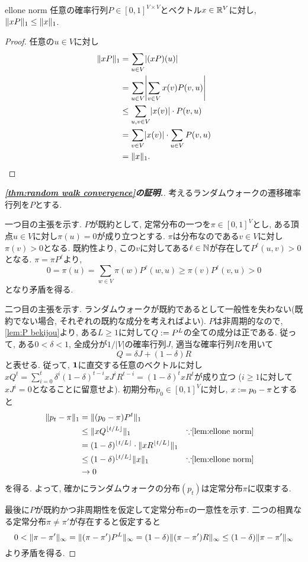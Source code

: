 \begin{lemma}{}{ellone norm}
  任意の確率行列$P\in[0,1]^{V\times V}$とベクトル$x\in\mathbb{R}^V$に対し,
  $\lVert xP\rVert_{1} \le \lVert x\rVert_{1}$.
\end{lemma}
\begin{proof}
  任意の$u\in V$に対し
  \begin{align*}
    \norm{xP}_1 &= \sum_{u\in V} \abs*{(xP)(u)} \\
    &= \sum_{u\in V} \abs*{ \sum_{v\in V} x(v) P(v,u) } \\
    &\le \sum_{u,v\in V}\abs{x(v)}\cdot P(v,u) \\
    &= \sum_{v\in V}\abs{x(v)}\cdot \sum_{u\in V}P(v,u) \\
    &= \norm{x}_1.
  \end{align*}
\end{proof}
\begin{proof}[\textbf{\cref{thm:random walk convergence}の証明.}]
  考えるランダムウォークの遷移確率行列を$P$とする.

  一つ目の主張を示す.
  $P$が既約として, 定常分布の一つを$\pi \in [0,1]^V$とし,
  ある頂点$u\in V$に対し$\pi(u)=0$が成り立つとする.
  $\pi$は分布なのである$v\in V$に対し$\pi(v)>0$となる.
  既約性より, この$v$に対してある$\ell\in\mathbb{N}$が存在して$P^\ell(u,v)>0$となる.
  $\pi =\pi P^\ell$より,
  \[
    0 = \pi(u) = \sum_{w\in V}\pi(w)P^\ell(w,u) \ge \pi(v)P^\ell(v,u)>0
  \]
  となり矛盾を得る.

  二つ目の主張を示す.
  ランダムウォークが既約であるとして一般性を失わない(既約でない場合, それぞれの既約な成分を考えればよい).
  $P$は非周期的なので, \cref{lem:P bekijou}より, ある$L\ge 1$に対して$Q\mathrel{:=} P^L$の全ての成分は正である.
  従って, ある$0<\delta<1$, 全成分が$1/|V|$の確率行列$J$, 適当な確率行列$R$を用いて
  \[
    Q = \delta J + (1-\delta)R
  \]
  と表せる.
  従って, $\mathbf{1}$に直交する任意のベクトルに対し$xQ^t = \sum_{i=0}^t \delta^i(1-\delta)^{t-i} x J^iR^{t-i} = (1-\delta)^t x R^t$が成り立つ ($i\ge 1$に対して$xJ^i=0$となることに留意せよ).
  初期分布$p_0\in[0,1]^V$に対し, $x\mathrel{:=} p_0 - \pi$とすると
  \begin{align*}
    \norm{p_t - \pi}_{1} &= \norm{(p_0-\pi)P^t}_{1} \\
    &\le \norm{xQ^{\floor{t/L}}}_{1} & & \text{$\because$\cref{lem:ellone norm}}\\
    &= (1-\delta)^{\floor{t/L}}\cdot \norm{x R^{\floor{t/L}}}_1 \\
    & \le (1-\delta)^{\floor{t/L}} \norm{x}_{1} & & \text{$\because$\cref{lem:ellone norm}} \\
    & \to 0
  \end{align*}
  を得る.
  よって, 確かにランダムウォークの分布$(p_t)$は定常分布$\pi$に収束する.

  最後に$P$が既約かつ非周期性を仮定して定常分布$\pi$の一意性を示す.
  二つの相異なる定常分布$\pi\neq \pi'$が存在すると仮定すると
  \[
    0<\lVert\pi - \pi'\rVert_{\infty} = \lVert(\pi - \pi')P^L\rVert_{\infty} = (1-\delta)\lVert(\pi - \pi')R\rVert_{\infty} \le (1-\delta)\lVert\pi - \pi'\rVert_{\infty}
  \]
  より矛盾を得る.
\end{proof}

